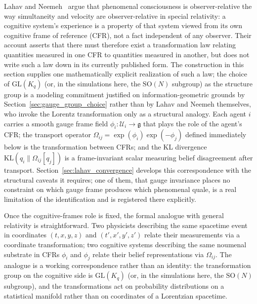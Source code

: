 \documentclass[11pt]{article}
\begin{document}
Lahav and Neemeh~\cite{LahavNeemeh2022, LahavNeemeh2025} argue that phenomenal consciousness is observer-relative the way simultaneity and velocity are observer-relative in special relativity: a cognitive system's experience is a property of that system viewed from its own cognitive frame of reference (CFR), not a fact independent of any observer. Their account asserts that there must therefore exist a transformation law relating quantities measured in one CFR to quantities measured in another, but does not write such a law down in its currently published form. The construction in this section supplies one mathematically explicit realization of such a law; the choice of $\mathrm{GL}(K_q)$ (or, in the simulations here, the $\mathrm{SO}(N)$ subgroup) as the structure group is a modeling commitment justified on information-geometric grounds by Section~\ref{sec:gauge_group_choice} rather than by Lahav and Neemeh themselves, who invoke the Lorentz transformation only as a structural analogy. Each agent $i$ carries a smooth gauge frame field $\phi_i: \mathcal{U}_i \to \mathfrak{g}$ that plays the role of the agent's CFR; the transport operator $\Omega_{ij} = \exp(\phi_i)\exp(-\phi_j)$ defined immediately below is the transformation between CFRs; and the KL divergence $\mathrm{KL}(q_i \| \Omega_{ij}[q_j])$ is a frame-invariant scalar measuring belief disagreement after transport. Section~\ref{sec:lahav_convergence} develops this correspondence with the structural caveats it requires; one of them, that gauge invariance places no constraint on which gauge frame produces which phenomenal quale, is a real limitation of the identification and is registered there explicitly.

Once the cognitive-frames role is fixed, the formal analogue with general relativity is straightforward. Two physicists describing the same spacetime event in coordinates $(t, x, y, z)$ and $(t', x', y', z')$ relate their measurements via a coordinate transformation; two cognitive systems describing the same noumenal substrate in CFRs $\phi_i$ and $\phi_j$ relate their belief representations via $\Omega_{ij}$. The analogue is a working correspondence rather than an identity: the transformation group on the cognitive side is $\mathrm{GL}(K_q)$ (or, in the simulations here, the $\mathrm{SO}(N)$ subgroup), and the transformations act on probability distributions on a statistical manifold rather than on coordinates of a Lorentzian spacetime.
\end{document}
